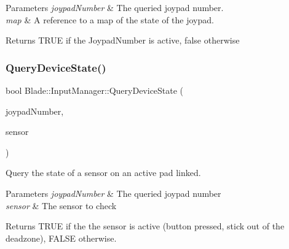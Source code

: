 \begin{DoxyParams}{Parameters}
{\em joypad\+Number} & The queried joypad number. \\
\hline
{\em map} & A reference to a map of the state of the joypad. \\
\hline
\end{DoxyParams}
\begin{DoxyReturn}{Returns}
T\+R\+UE if the Joypad\+Number is active, false otherwise 
\end{DoxyReturn}
\mbox{\label{class_blade_1_1_input_manager_aeeafae24c87fd12586942eba26956807}} 
\subsubsection{\texorpdfstring{Query\+Device\+State()}{QueryDeviceState()}}
{\footnotesize\ttfamily bool Blade\+::\+Input\+Manager\+::\+Query\+Device\+State (\begin{DoxyParamCaption}\item[{Joypad\+Number}]{joypad\+Number,  }\item[{\hyperlink{namespace_blade_a1ecca198b7e0afbe43139ec2b0db937c}{Input\+Sensor}}]{sensor }\end{DoxyParamCaption})}



Query the state of a sensor on an active pad linked. 


\begin{DoxyParams}{Parameters}
{\em joypad\+Number} & The queried joypad number \\
\hline
{\em sensor} & The sensor to check \\
\hline
\end{DoxyParams}
\begin{DoxyReturn}{Returns}
T\+R\+UE if the the sensor is active (button pressed, stick out of the deadzone), F\+A\+L\+SE otherwise. 
\end{DoxyReturn}
\mbox{\label{class_blade_1_1_input_manager_a8d8e424cb1de012c830296a0812ceebc}} 

